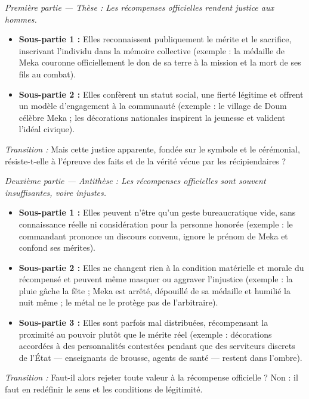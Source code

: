 \documentclass[11pt]{article}
\begin{document}
\begin{exoresolu}
\emph{Première partie — Thèse : Les récompenses officielles rendent justice aux hommes.}
\begin{itemize}
\item \textbf{Sous-partie 1 :} Elles reconnaissent publiquement le mérite et le sacrifice, inscrivant l'individu dans la mémoire collective (exemple : la médaille de Meka couronne officiellement le don de sa terre à la mission et la mort de ses fils au combat).
\item \textbf{Sous-partie 2 :} Elles confèrent un statut social, une fierté légitime et offrent un modèle d'engagement à la communauté (exemple : le village de Doum célèbre Meka ; les décorations nationales inspirent la jeunesse et valident l'idéal civique).
\end{itemize}
\emph{Transition :} Mais cette justice apparente, fondée sur le symbole et le cérémonial, résiste-t-elle à l'épreuve des faits et de la vérité vécue par les récipiendaires ?

\emph{Deuxième partie — Antithèse : Les récompenses officielles sont souvent insuffisantes, voire injustes.}
\begin{itemize}
\item \textbf{Sous-partie 1 :} Elles peuvent n'être qu'un geste bureaucratique vide, sans connaissance réelle ni considération pour la personne honorée (exemple : le commandant prononce un discours convenu, ignore le prénom de Meka et confond ses mérites).
\item \textbf{Sous-partie 2 :} Elles ne changent rien à la condition matérielle et morale du récompensé et peuvent même masquer ou aggraver l'injustice (exemple : la pluie gâche la fête ; Meka est arrêté, dépouillé de sa médaille et humilié la nuit même ; le métal ne le protège pas de l'arbitraire).
\item \textbf{Sous-partie 3 :} Elles sont parfois mal distribuées, récompensant la proximité au pouvoir plutôt que le mérite réel (exemple : décorations accordées à des personnalités contestées pendant que des serviteurs discrets de l'État — enseignants de brousse, agents de santé — restent dans l'ombre).
\end{itemize}
\emph{Transition :} Faut-il alors rejeter toute valeur à la récompense officielle ? Non : il faut en redéfinir le sens et les conditions de légitimité.


\end{exoresolu}
\end{document}
